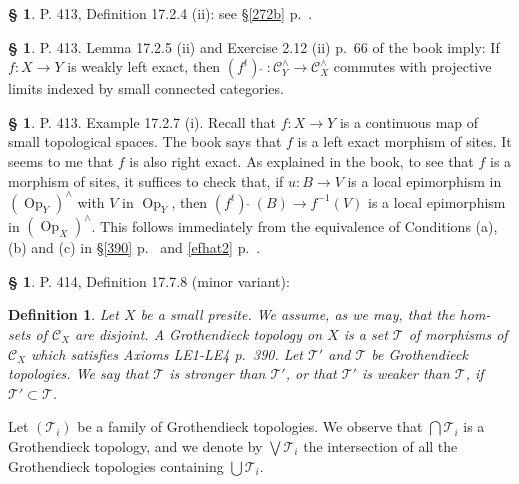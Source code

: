 \documentclass[12pt]{article}%
\newtheorem{df}[thm]{Definition}%
\theoremstyle{remark}
\theoremstyle{definition}
\newtheorem{s}[thm]{\S}%
\newcommand{\cc}{\mathcal}
\newcommand{\oo}{\operatorname}
\newcommand{\C}{\mathcal C}
\newcommand{\fthat}{(f^t)\ \widehat{}\ }
\begin{document}
%

\begin{s}\label{1724ii}
P. 413, Definition 17.2.4 (ii): see \S\ref{272b} p.~\pageref{272b}.
\end{s}

%

\begin{s}
P. 413. Lemma 17.2.5 (ii) and Exercise 2.12 (ii) p.~66 of the book imply: If $f:X\to Y$ is weakly left exact, then $\fthat:\C_Y^\wedge\to\C_X^\wedge$ commutes with projective limits indexed by small connected categories.
\end{s}

%

\begin{s}
P. 413. Example 17.2.7 (i). Recall that $f:X\to Y$ is a continuous map of small topological spaces. The book says that $f$ is a left exact morphism of sites. It seems to me that $f$ is also right exact. As explained in the book, to see that $f$ is a morphism of sites, it suffices to check that, if $u:B\to V$ is a local epimorphism in $(\oo{Op}_Y)^\wedge$ with $V$ in $\oo{Op}_Y$, then $\fthat(B)\to f^{-1}(V)$ is a local epimorphism in $(\oo{Op}_X)^\wedge$. This follows immediately from the equivalence of Conditions (a), (b) and (c) in \S\ref{390} p.~\pageref{390} and \eqref{efhat2} p.~\pageref{efhat2}. 
\end{s}

%

\begin{s} 
P. 414, Definition 17.7.8 (minor variant):

\begin{df}\label{1778}
Let $X$ be a small presite. We assume, as we may, that the hom-sets of $\C_X$ are disjoint. A {\em Grothendieck topology} on $X$ is a set $\cc T$ of morphisms of $\C_X$ which satisfies Axioms LE1-LE4 p.~390. Let $\cc T'$ and $\cc T$ be Grothendieck topologies. We say that $\cc T$ is {\em stronger than} $\cc T'$, or that $\cc T'$ is {\em weaker than} $\cc T$, if $\cc T'\subset\cc T$. 
\end{df}

Let $(\cc T_i)$ be a family of Grothendieck topologies. We observe that $\bigcap\cc T_i$ is a Grothendieck topology, and we denote by $\bigvee\cc T_i$ the intersection of all the Grothendieck topologies containing $\bigcup\cc T_i$.
\end{s}

%
\end{document}
